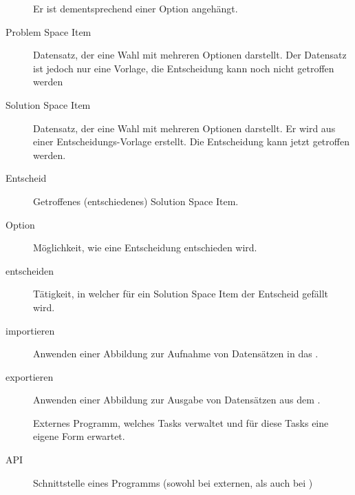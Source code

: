 \begin{description}
				Er ist dementsprechend einer Option angehängt.
			\item[Problem Space Item] Datensatz, der eine Wahl mit mehreren Optionen darstellt.
				Der Datensatz ist jedoch nur eine Vorlage, 
				die Entscheidung kann noch nicht getroffen werden
			\item[Solution Space Item] Datensatz, der eine Wahl mit mehreren Optionen darstellt.
				Er wird aus einer Entscheidungs-Vorlage erstellt.
				Die Entscheidung kann jetzt getroffen werden.
			\item[Entscheid] Getroffenes (entschiedenes) Solution Space Item.
			\item[Option] Möglichkeit, wie eine Entscheidung entschieden wird.
			\item[entscheiden] Tätigkeit, 
				in welcher für ein Solution Space Item der Entscheid gefällt wird.
			\item[importieren] Anwenden einer Abbildung zur Aufnahme von Datensätzen in das \eeppi.
			\item[exportieren] Anwenden einer Abbildung zur Ausgabe von Datensätzen aus dem \eeppi.
			\item[\ppt] Externes Programm, 
				welches Tasks verwaltet und für diese Tasks eine eigene Form erwartet.
			\item[API] Schnittstelle eines Programms (sowohl bei externen, als auch bei \eeppi)
		\end{description}

